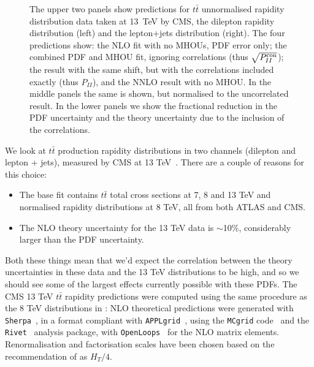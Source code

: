 \begin{figure}[H]
  \vspace{-0.55cm}
  \caption{The upper two panels show predictions for $t\bar{t}$ unnormalised rapidity distribution data taken at 13~TeV by CMS, the dilepton rapidity distribution \cite{Sirunyan:2018ucr} (left) and the lepton+jets distribution \cite{Sirunyan:2018wem} (right). The four predictions show: the NLO fit with no MHOUs, PDF error only; the combined PDF and MHOU fit, ignoring correlations (thus $\sqrt{P_{II}^{\rm con}}$); the result with the same shift, but with the correlations included exactly (thus $P_{II}$), and the NNLO result with no MHOU. In the middle panels the same is shown, but normalised to the uncorrelated result. In the lower panels we show the fractional reduction in the PDF uncertainty and the theory uncertainty due to the inclusion of the correlations.}
  \label{fig:CMSttbar}
\end{figure}

We look at $t\bar{t}$ production rapidity distributions in two channels (dilepton and lepton + jets), measured by CMS at 13 TeV~\cite{Sirunyan:2018ucr,Sirunyan:2018wem}. There are a couple of reasons for this choice:
\begin{itemize}
\item The base fit contains $t\bar{t}$ total cross sections at 7, 8 and 13 TeV and normalised rapidity distributions at 8 TeV, all from both ATLAS and CMS.
\item The NLO theory uncertainty for the 13 TeV data is $\sim$10\%, considerably larger than the PDF uncertainty.
\end{itemize}
Both these things mean that we'd expect the correlation between the theory uncertainties in these data and the 13 TeV distributions to be high, and so we should see some of the largest effects currently possible with these PDFs. The CMS 13 TeV $t\bar{t}$ rapidity predictions were computed using the same procedure as the 8 TeV distributions in \cite{Ball:2017nwa}: NLO theoretical predictions were generated with {\tt Sherpa}~\cite{Gleisberg:2008ta}, in a format compliant with {\tt APPLgrid}~\cite{Carli:2010rw}, using the {\tt MCgrid} 
code~\cite{DelDebbio:2013kxa} and the {\tt Rivet}~\cite{Buckley:2010ar} analysis package, with {\tt OpenLoops}~\cite{Cascioli:2011va} for the NLO 
matrix elements. Renormalisation and factorisation scales have been chosen based on the recommendation of \cite{Czakon:2016dgf} as $H_T/4$.

